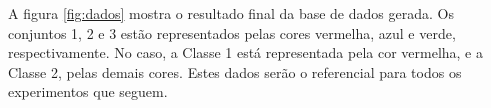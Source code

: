 A figura \ref{fig:dados} mostra o resultado final da base de dados gerada. Os conjuntos 1, 2 e 3 estão representados pelas cores vermelha, azul e verde, respectivamente. No caso, a Classe 1 está representada pela cor vermelha, e a Classe 2, pelas demais cores. Estes dados serão o referencial para todos os experimentos que seguem.



